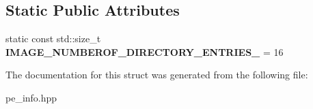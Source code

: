 \subsection*{Static Public Attributes}
\begin{DoxyCompactItemize}
\item 
\mbox{\label{a01608_a52f29423206a1a911c33714b2bb547a1}} 
static const std\+::size\+\_\+t {\bfseries I\+M\+A\+G\+E\+\_\+\+N\+U\+M\+B\+E\+R\+O\+F\+\_\+\+D\+I\+R\+E\+C\+T\+O\+R\+Y\+\_\+\+E\+N\+T\+R\+I\+E\+S\+\_\+} = 16
\end{DoxyCompactItemize}


The documentation for this struct was generated from the following file\+:\begin{DoxyCompactItemize}
\item 
pe\+\_\+info.\+hpp\end{DoxyCompactItemize}
